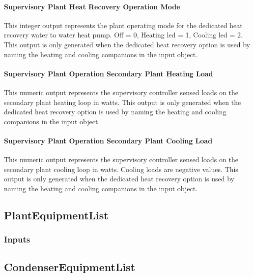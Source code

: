 \paragraph{Supervisory Plant Heat Recovery Operation Mode}\label{operation-scheme-outputs-hr-operation-mode}

This integer output represents the plant operating mode for the dedicated heat recovery water to water heat pump.  Off = 0, Heating led = 1, Cooling led = 2.  This output is only generated when the dedicated heat recovery option is used by naming the heating and cooling companions in the input object. 

\paragraph{Supervisory Plant Operation Secondary Plant Heating Load}\label{operation-scheme-outputs-supervisory-secondary-plant-heating-loads}

This numeric output represents the supervisory controller sensed loads on the secondary plant heating loop in watts.  This output is only generated when the dedicated heat recovery option is used by naming the heating and cooling companions in the input object. 

\paragraph{Supervisory Plant Operation Secondary Plant Cooling Load}\label{operation-scheme-outputs-supervisory-secondary-plant-cooling-loads}

This numeric output represents the supervisory controller sensed loads on the secondary plant cooling loop in watts.  Cooling loads are negative values. This output is only generated when the dedicated heat recovery option is used by naming the heating and cooling companions in the input object. 

\subsection{PlantEquipmentList}\label{plantequipmentlist}

\subsubsection{Inputs}\label{inputs-14-009}

\subsection{CondenserEquipmentList}\label{condenserequipmentlist}

